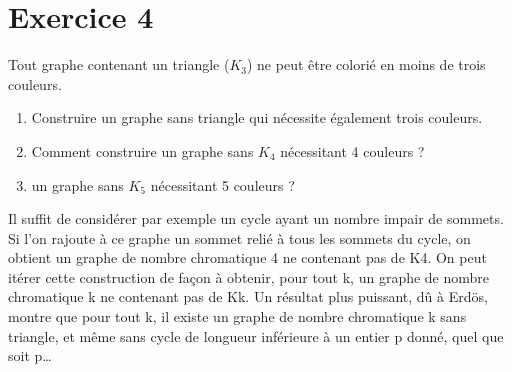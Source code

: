 \documentclass[10pt,a4paper]{article}
\begin{document}
\section*{Exercice 4}

Tout graphe contenant un triangle ($K_3$) ne peut être colorié en moins de trois couleurs.

\begin{enumerate}
    \item Construire un graphe sans triangle qui nécessite également trois couleurs.
    \item Comment construire un graphe sans $K_4$ nécessitant 4 couleurs ?
    \item un graphe sans $K_5$ nécessitant 5 couleurs ?
\end{enumerate}

\begin{tcolorbox}
Il suffit de considérer par exemple un cycle ayant un nombre impair de sommets. Si l’on rajoute à ce graphe un sommet relié à tous les sommets du cycle, on obtient un graphe de nombre chromatique 4 ne contenant pas de K4. On peut itérer cette construction de façon à obtenir, pour tout k, un graphe de nombre chromatique k ne contenant pas de Kk. Un résultat plus puissant, dû à Erdös, montre que pour tout k, il existe un graphe de nombre chromatique k sans triangle, et même sans cycle de longueur inférieure à un entier p donné, quel que soit p…
\end{tcolorbox}
\end{document}
